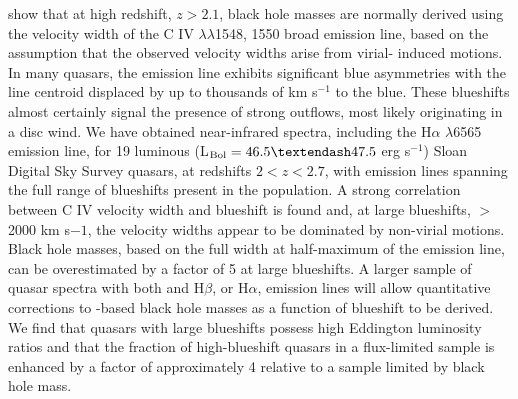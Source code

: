 \documentclass[a4paper,fleqn,usenatbib]{mnras}
\begin{document}
\citet{Coatman2016} show that at high redshift, $z>2.1$, black hole
masses are normally derived using the velocity width of the C IV
$\lambda \lambda$1548, 1550 broad emission line, based on the
assumption that the observed velocity widths arise from virial-
induced motions. In many quasars, the \civ emission line exhibits
significant blue asymmetries  with the line centroid
displaced by up to thousands of km s$^{-1}$ to the blue. These blueshifts
almost certainly signal the presence of strong outflows, most likely
originating in a disc wind. We have obtained near-infrared spectra,
including the H$\alpha$ $\lambda$6565 emission line, for 19 luminous 
(L$_{\rm Bol} =46.5–47.5$ erg s$^{-1}$) Sloan Digital Sky Survey quasars, at redshifts $2 <
z < 2.7$, with \civ emission lines spanning the full range of
blueshifts present in the population. A strong correlation between C
IV velocity width and blueshift is found and, at large blueshifts,
$>$2000 km s$−1$, the velocity widths appear to be dominated by non-virial
motions. Black hole masses, based on the full width at half-maximum of
the \civ emission line, can be overestimated by a factor of 5 at large
blueshifts. A larger sample of quasar spectra with both \civ and H$\beta$, 
or H$\alpha$, emission lines will allow quantitative corrections to \civ-based black hole masses as a function of blueshift to be
derived. We find that quasars with large \civ blueshifts possess high
Eddington luminosity ratios and that the fraction of high-blueshift
quasars in a flux-limited sample is enhanced by a factor of
approximately 4 relative to a sample limited by black hole mass.
\end{document}
